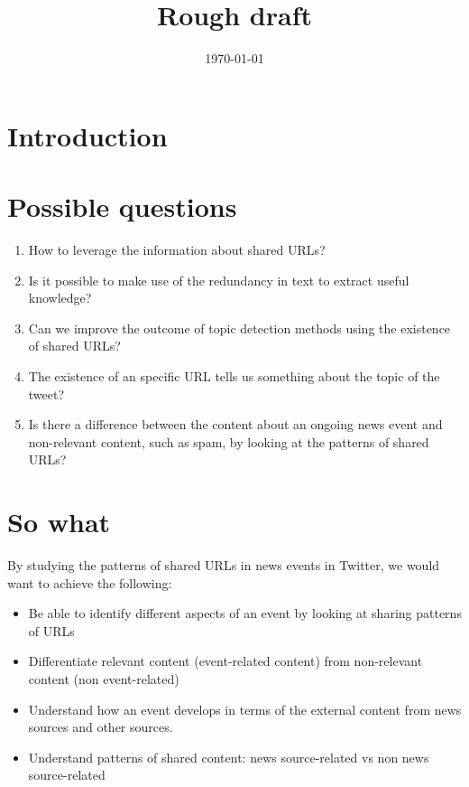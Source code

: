 \documentclass{article}
\title{Rough draft}
\date{\today}
\begin{document}
\maketitle

\section{Introduction}

\section{Possible questions}

\begin{enumerate}
\item How to leverage the information about shared URLs?
\item Is it possible to make use of the redundancy in text to extract
  useful knowledge?
\item Can we improve the outcome of topic detection methods using the
  existence of shared URLs?
\item The existence of an specific URL tells us something about the
  topic of the tweet?
\item Is there a difference between the content about an ongoing news
  event and non-relevant content, such as spam, by looking at the
  patterns of shared URLs?

\end{enumerate}

\section{So what}

By studying the patterns of shared URLs in news events in Twitter, we
would want to achieve the following:

\begin{itemize}
\item Be able to identify different aspects of an event by looking at
  sharing patterns of URLs
\item Differentiate relevant content (event-related content) from
  non-relevant content (non event-related)
\item Understand how an event develops in terms of the external
  content from news sources and other sources.
\item Understand patterns of shared content: news source-related vs
  non news source-related
\end{itemize}
\end{document}

